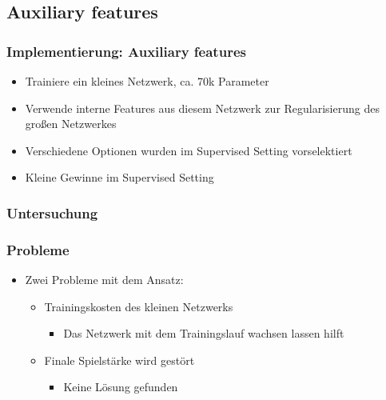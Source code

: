 \subsection{Auxiliary features}



\begin{frame}
 \frametitle{Implementierung: Auxiliary features}
  


\begin{itemize}
  \item \pause Trainiere ein kleines Netzwerk, ca. 70k Parameter
  \item \pause Verwende interne Features aus diesem Netzwerk zur Regularisierung des großen Netzwerkes
  \item \pause Verschiedene Optionen wurden im Supervised Setting vorselektiert
  \item \pause Kleine Gewinne im Supervised Setting
\end{itemize}

  
\end{frame}
\begin{frame}
 \frametitle{Untersuchung}
  


  
\end{frame}
\begin{frame}
 \frametitle{Probleme}
  


\begin{itemize}
  \item \pause Zwei Probleme mit dem Ansatz:
\begin{itemize}
  \item \pause Trainingskosten des kleinen Netzwerks
\begin{itemize}
  \item \pause Das Netzwerk mit dem Trainingslauf wachsen lassen hilft
\end{itemize}
  \item \pause Finale Spielstärke wird gestört
\begin{itemize}
  \item \pause Keine Lösung gefunden
\end{itemize}
\end{itemize}
\end{itemize}

  
\end{frame}

